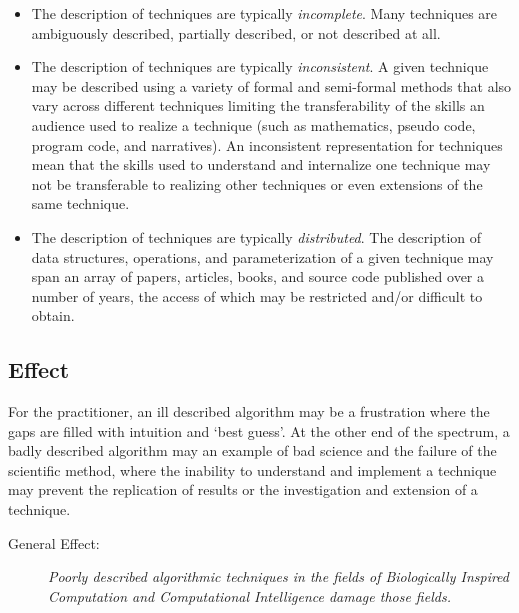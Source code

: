 \documentclass[a4paper, 11pt]{article}
\begin{document}
\begin{itemize}
	\item The description of techniques are typically \emph{incomplete}. Many techniques are ambiguously described, partially described, or not described at all.
	\item The description of techniques are typically \emph{inconsistent}. A given technique may be described using a variety of formal and semi-formal methods that also vary across different techniques limiting the transferability of the skills an audience used to realize a technique (such as mathematics, pseudo code, program code, and narratives). An inconsistent representation for techniques mean that the skills used to understand and internalize one technique may not be transferable to realizing other techniques or even extensions of the same technique.
	\item The description of techniques are typically \emph{distributed}. The description of data structures, operations, and parameterization of a given technique may span an array of papers, articles, books, and source code published over a number of years, the access of which may be restricted and/or difficult to obtain.
\end{itemize}

\subsection{Effect}
For the practitioner, an ill described algorithm may be a frustration where the gaps are filled with intuition and `best guess'. At the other end of the spectrum, a badly described algorithm may an example of bad science and the failure of the scientific method, where the inability to understand and implement a technique may prevent the replication of results or the investigation and extension of a technique. 

\begin{description}
	\item[General Effect:]\emph{Poorly described algorithmic techniques in the fields of Biologically Inspired Computation and Computational Intelligence damage those fields.}
\end{description}
\end{document}
